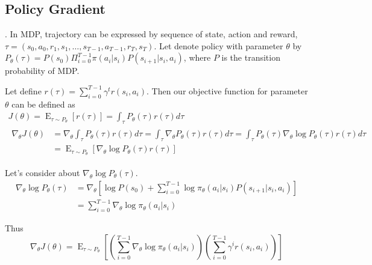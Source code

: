 \documentclass[8pt]{beamer}
\begin{document}
\subsection{Policy Gradient}
\begin{frame}{.}
    In MDP, trajectory can be expressed by sequence of state, action and reward, $\tau = (s_0, a_0, r_1, s_1, \dots, s_{T-1}, a_{T-1}, r_{T}, s_{T})$. 
    Let denote policy with parameter $\theta$ by $P_\theta(\tau) = P(s_0) \Pi_{i=0}^{T-1} \pi(a_i|s_i) P(s_{i+1}| s_i, a_i) $, where $P$ is the transition probability of MDP.

    Let define $r(\tau) = \sum_{i=0}^{T-1} \gamma^t r(s_i, a_i)$. Then our objective function for parameter $\theta$ can be defined as 
    \[
    \begin{gathered}
        J(\theta) = \operatorname{E}_{\tau \sim P_\theta}[r(\tau)] = \int_{\tau} P_\theta(\tau) r(\tau) d\tau \\
        \begin{aligned}
            \nabla_{\theta} J(\theta) &= \nabla_\theta \int_\tau P_\theta (\tau) r(\tau) d\tau = \int_\tau \nabla_\theta P_\theta (\tau) r(\tau) d\tau = \int_\tau P_\theta (\tau) \nabla_\theta \log{P_\theta(\tau)} r(\tau) d\tau\\ 
            &= \operatorname{E}_{\tau \sim P_\theta}[\nabla_\theta \log{P_\theta (\tau)} r(\tau)] 
        \end{aligned}
    \end{gathered}
    \]

    Let's consider about $\nabla_\theta \log{P_\theta (\tau)}$.
    \[
        \begin{aligned}
            \nabla_\theta \log{P_\theta (\tau)} &= \nabla_\theta [\log{P(s_0)} + \sum_{i=0}^{T-1} \log{\pi_\theta (a_i| s_i) P(s_{i+1}| s_i, a_i) } ]\\
            &= \sum_{i=0}^{T-1} \nabla_\theta \log{\pi_\theta (a_i |s_i)}
        \end{aligned}
    \]
    
    Thus
    \[
        \nabla_\theta J(\theta) = \operatorname{E}_{\tau \sim P_\theta}\left[\left(\sum_{i=0}^{T-1}\nabla_\theta \log{\pi_\theta}(a_i|s_i)\right) \left(\sum_{i=0}^{T-1} \gamma^i r(s_i, a_i) \right)\right]
    \]
\end{frame}
\end{document}
